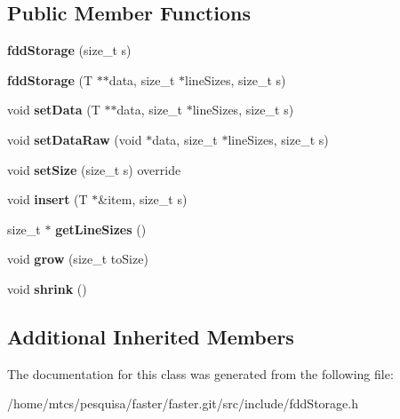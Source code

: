 \subsection*{Public Member Functions}
\begin{DoxyCompactItemize}
\item 
\hypertarget{classfaster_1_1fddStorage_3_01T_01_5_01_4_a949dbdd099a0dc2b54cec12cfb3f21b0}{}\label{classfaster_1_1fddStorage_3_01T_01_5_01_4_a949dbdd099a0dc2b54cec12cfb3f21b0} 
{\bfseries fdd\+Storage} (size\+\_\+t s)
\item 
\hypertarget{classfaster_1_1fddStorage_3_01T_01_5_01_4_a6272c1fb1e8bdff3c70f8fbe46c90fc4}{}\label{classfaster_1_1fddStorage_3_01T_01_5_01_4_a6272c1fb1e8bdff3c70f8fbe46c90fc4} 
{\bfseries fdd\+Storage} (T $\ast$$\ast$data, size\+\_\+t $\ast$line\+Sizes, size\+\_\+t s)
\item 
\hypertarget{classfaster_1_1fddStorage_3_01T_01_5_01_4_a4835be07a5ec230490f03da7cb8e3e16}{}\label{classfaster_1_1fddStorage_3_01T_01_5_01_4_a4835be07a5ec230490f03da7cb8e3e16} 
void {\bfseries set\+Data} (T $\ast$$\ast$data, size\+\_\+t $\ast$line\+Sizes, size\+\_\+t s)
\item 
\hypertarget{classfaster_1_1fddStorage_3_01T_01_5_01_4_aeb87efbfa61cc52dfc3bbdc3d09408dd}{}\label{classfaster_1_1fddStorage_3_01T_01_5_01_4_aeb87efbfa61cc52dfc3bbdc3d09408dd} 
void {\bfseries set\+Data\+Raw} (void $\ast$data, size\+\_\+t $\ast$line\+Sizes, size\+\_\+t s)
\item 
\hypertarget{classfaster_1_1fddStorage_3_01T_01_5_01_4_a5a918f95b08ed5a81fbb8831b0fc196e}{}\label{classfaster_1_1fddStorage_3_01T_01_5_01_4_a5a918f95b08ed5a81fbb8831b0fc196e} 
void {\bfseries set\+Size} (size\+\_\+t s) override
\item 
\hypertarget{classfaster_1_1fddStorage_3_01T_01_5_01_4_ae6b278b0a9dc5a96821438f0fb667489}{}\label{classfaster_1_1fddStorage_3_01T_01_5_01_4_ae6b278b0a9dc5a96821438f0fb667489} 
void {\bfseries insert} (T $\ast$\&item, size\+\_\+t s)
\item 
\hypertarget{classfaster_1_1fddStorage_3_01T_01_5_01_4_a250174b04b8f617d55d4a84e5de52ee3}{}\label{classfaster_1_1fddStorage_3_01T_01_5_01_4_a250174b04b8f617d55d4a84e5de52ee3} 
size\+\_\+t $\ast$ {\bfseries get\+Line\+Sizes} ()
\item 
\hypertarget{classfaster_1_1fddStorage_3_01T_01_5_01_4_a76493eba9895f152a95b547a2485bc3a}{}\label{classfaster_1_1fddStorage_3_01T_01_5_01_4_a76493eba9895f152a95b547a2485bc3a} 
void {\bfseries grow} (size\+\_\+t to\+Size)
\item 
\hypertarget{classfaster_1_1fddStorage_3_01T_01_5_01_4_adac945484d94be1469e4cf9eb6e8c16c}{}\label{classfaster_1_1fddStorage_3_01T_01_5_01_4_adac945484d94be1469e4cf9eb6e8c16c} 
void {\bfseries shrink} ()
\end{DoxyCompactItemize}
\subsection*{Additional Inherited Members}


The documentation for this class was generated from the following file\+:\begin{DoxyCompactItemize}
\item 
/home/mtcs/pesquisa/faster/faster.\+git/src/include/fdd\+Storage.\+h\end{DoxyCompactItemize}
